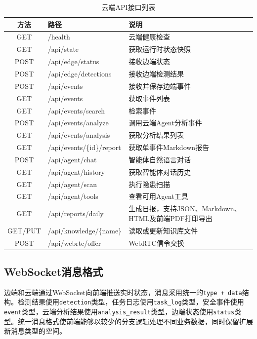 \begin{table}[H]
\caption{云端API接口列表}
\begin{center}
\begin{tabular}{clp{7.5cm}}
\toprule
方法   & 路径                          & 说明 \\
\midrule
GET    & /health                       & 云端健康检查 \\
GET    & /api/state                    & 获取运行时状态快照 \\
POST   & /api/edge/status              & 接收边端状态 \\
POST   & /api/edge/detections          & 接收边端检测结果 \\
POST   & /api/events                   & 接收并保存边端事件 \\
GET    & /api/events                   & 获取事件列表 \\
GET    & /api/events/search            & 检索事件 \\
POST   & /api/events/analyze           & 调用云端Agent分析事件 \\
GET    & /api/events/analysis          & 获取分析结果列表 \\
GET    & /api/events/\{id\}/report    & 获取单事件Markdown报告 \\
POST   & /api/agent/chat               & 智能体自然语言对话 \\
GET    & /api/agent/history            & 获取智能体对话历史 \\
GET    & /api/agent/scan               & 执行隐患扫描 \\
GET    & /api/agent/tools              & 查看可用Agent工具 \\
GET    & /api/reports/daily            & 生成日报，支持JSON、Markdown、HTML及前端PDF打印导出 \\
GET/PUT & /api/knowledge/\{name\}      & 读取或更新知识库文件 \\
POST   & /api/webrtc/offer             & WebRTC信令交换 \\
\bottomrule
\end{tabular}
\end{center}
\label{tb:api}
\end{table}

\subsection{WebSocket消息格式}

边端和云端通过WebSocket向前端推送实时状态，消息采用统一的\verb|type + data|结构。检测结果使用\verb|detection|类型，任务日志使用\verb|task_log|类型，安全事件使用\verb|event|类型，云端分析结果使用\verb|analysis_result|类型，边端状态使用\verb|status|类型。统一消息格式使前端能够以较少的分支逻辑处理不同业务数据，同时保留扩展新消息类型的空间。

